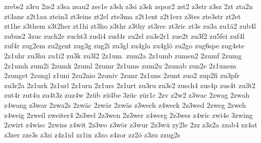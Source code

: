 {zrebs2
z3ru
2zs2
z3sa
zsau2
zse1e
z3sh
z3si
z3sk
zspor2
zst2
z3str
z3sz
2zt
zta2n
zt3ane
z2t1au
ztein3
zt3eins
zt2el
zte3ma
z2t1ent
z2t1erz
z3tes
zte3str
zt2et
zt1he
z3them
z3t2her
zt1hi
zt3ho
z3thr
z3thy
zt3rec
zt3ric
zt3s
zu3a
zu1ä2
zub4l
zubus2
3zuc
zuch2e
zucht3
zudi4
zud4r
zu2el
zu3e2r1
zue2t
zu3f2
zu5fei
zuf4l
zuf4r
zug2em
zu2gent
zug3g
zug2i
zu3gl
zu4gla
zu4glö
zu2go
zug6spe
zug4ste
2z1uhr
zu3hu
zu1i2
zu3k
zu3l2
2z1um.
zum2a
2z1umb
zumen2
2zumf
2zumg
2z1umh
zum2i
2zumk
2zuml
2zumr
2z1ums
zum2u
2zunab
zun2e
2z1unem
2zunget
2zungl
z1uni
2zu2nio
2zuniv
2zunr
2z1uns
2zunt
zuo2
zup2fi
zu3pfr
zu3r2a
2z1urk
2z1url
2z1urn
2z1urs
2z1urt
zu3ru
zu3s2
zusch4
zus4p
zus4t
zu3t2
zut4r
zut4u
zu4t3z
zuz4w
2züb
zü4be
3züc
zür1c
2zv
z2w2
z3wac
2zwag
2zwah
z4wang
z3war
2zwa2s
2zwäc
2zwär
2zwäs
z3wech
z4weck
2z3wed
2zweg
2zweh
z4weig
2zweil
zweiter4
2z3wel
2z3wen
2z3wer
z4werg
2z3wes
z4wic
zwi4e
3zwing
2zwirt
z4wisc
2zwiss
z4wit
2z3wo
z3wör
z3wur
2z3wü
zy2le
2zz
z3z2a
zzab4
zz4at
z3zer
zze3s
z3zi
z4z1id
zz1in
z3zo
z4zor
zz2ö
z3zu
zzug2s
}

\endinput

